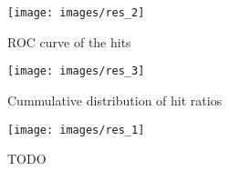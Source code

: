 \begin{figure}
\centerline{\texttt{[image: images/res\_2]}}
\caption[TODO]{ROC curve of the hits}
\label{obr:res_2}
\end{figure}

\begin{figure}
\centerline{\texttt{[image: images/res\_3]}}
\caption[TODO]{Cummulative distribution of hit ratios}
\label{obr:res_3}
\end{figure}

\begin{figure}
\centerline{\texttt{[image: images/res\_1]}}
\caption[TODO]{TODO}
\label{obr:res_1}
\end{figure}
